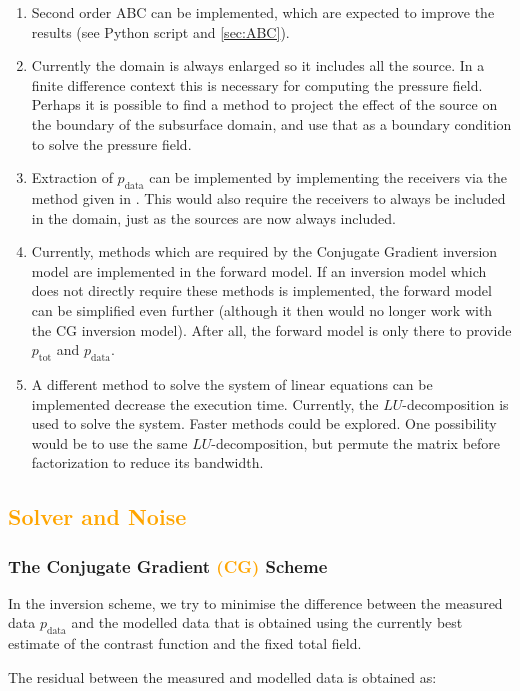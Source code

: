 \documentclass[10pt,a4paper]{article}
\begin{document}
\begin{enumerate}
	\item Second order ABC can be implemented, which are expected to improve the results (see Python script and \cref{sec:ABC}).
	\item Currently the domain is always enlarged so it includes all the source. In a finite difference context this is necessary for computing the pressure field. Perhaps it is possible to find a method to project the effect of the source on the boundary of the subsurface domain, and use that as a boundary condition to solve the pressure field.
	\item Extraction of $p_{\text{data}}$ can be implemented by implementing the receivers via the method given in \cite{Hicks}. This would also require the receivers to always be included in the domain, just as the sources are now always included.
	\item Currently, methods which are required by the Conjugate Gradient inversion model are implemented in the forward model. If an inversion model which does not directly require these methods is implemented, the forward model can be simplified even further (although it then would no longer work with the CG inversion model). After all, the forward model is only there to provide $p_{\text{tot}}$ and $p_{\text{data}}$.
	\item A different method to solve the system of linear equations can be implemented decrease the execution time. Currently, the $LU$-decomposition is used to solve the system. Faster methods could be explored. One possibility would be to use the same $LU$-decomposition, but permute the matrix before factorization to reduce its bandwidth.
\end{enumerate}


\subsection{\textcolor{orange}{Solver and Noise}}
\subsubsection{The Conjugate Gradient \textcolor{orange}{(CG)} Scheme}
\label{conjgrad}
In the inversion scheme, we try to minimise the difference between the
measured data $p_\text{data}$ and the modelled data that is obtained
using the currently best estimate of the contrast function and the
fixed total field.

The residual between the measured and modelled data is obtained as:
\end{document}
